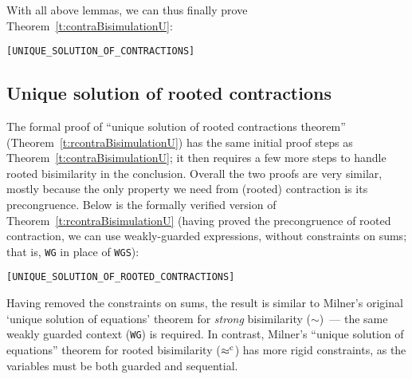 With all above lemmas, we can thus finally prove Theorem~\ref{t:contraBisimulationU}:
\begin{alltt}
\HOLTokenTurnstile{}   \HOLSymConst{\HOLTokenConj{}}  \HOLSymConst{\HOLTokenContracts{}}   \HOLSymConst{\HOLTokenConj{}}  \HOLSymConst{\HOLTokenContracts{}}   \HOLSymConst{\HOLTokenImp{}}  \HOLSymConst{\HOLTokenWeakEQ} \hfill{[UNIQUE_SOLUTION_OF_CONTRACTIONS]}
\end{alltt}

\subsection{Unique solution of rooted contractions}

The formal proof of ``unique solution of rooted contractions theorem''
(Theorem~\ref{t:rcontraBisimulationU}) has the
same initial proof steps as Theorem~\ref{t:contraBisimulationU}; 
it then requires a
few more steps to handle  rooted bisimilarity in the conclusion. 
Overall  the
two proofs are very similar, mostly because the only property we need
from (rooted) contraction is its precongruence. 
 Below is the formally verified version of
Theorem~\ref{t:rcontraBisimulationU}
(having proved
the precongruence of rooted contraction, 
we can use  weakly-guarded expressions,   without constraints on  sums;
that is, \texttt{WG} in place of \texttt{WGS}):
\begin{alltt}
\HOLTokenTurnstile{}   \HOLSymConst{\HOLTokenConj{}}  \HOLSymConst{\HOLTokenObsContracts}   \HOLSymConst{\HOLTokenConj{}}  \HOLSymConst{\HOLTokenObsContracts}   \HOLSymConst{\HOLTokenImp{}}  \HOLSymConst{\HOLTokenObsCongr} \hfill{[UNIQUE_SOLUTION_OF_ROOTED_CONTRACTIONS]}
\end{alltt}

Having removed the  constraints on sums, the result is
 similar to Milner's original `unique solution of
equations' theorem for \emph{strong} bisimilarity ($\sim$)~--- 
the same weakly guarded context (\texttt{WG}) is required.
In contrast, Milner's ``unique solution of
equations'' theorem for rooted bisimilarity ($\mathrel{\approx^{\rm{c}}}$)
has more rigid constraints, as the variables must be both guarded and sequential.
